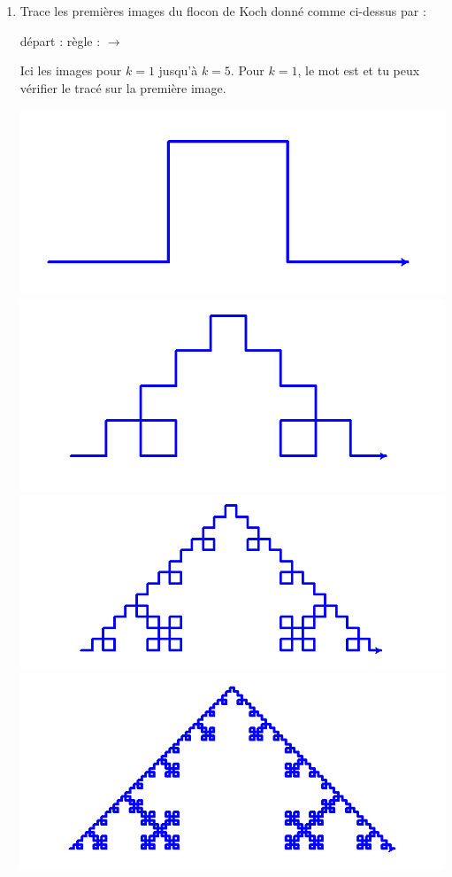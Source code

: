 \documentclass[11pt,class=report,crop=false]{standalone}
\begin{document}
\begin{activite}
\begin{enumerate}
\begin{itemize}
  \end{itemize}
  
  \item Trace les premières images du  flocon de Koch donné comme ci-dessus par : \\
  \centerline{départ :  \qquad règle :  $\rightarrow$ } 
  
  
  Ici les images pour $k=1$ jusqu'à $k=5$.
  Pour $k=1$, le mot est  et tu peux vérifier le tracé sur la première image.
  
\begin{center}
\includegraphics[scale=\myscale,scale=0.22]{ecran-lsysteme-3a}
\includegraphics[scale=\myscale,scale=0.22]{ecran-lsysteme-3b}
\includegraphics[scale=\myscale,scale=0.22]{ecran-lsysteme-3c}
\includegraphics[scale=\myscale,scale=0.22]{ecran-lsysteme-3d}

\end{center}
\end{enumerate}
\end{activite}
\end{document}
